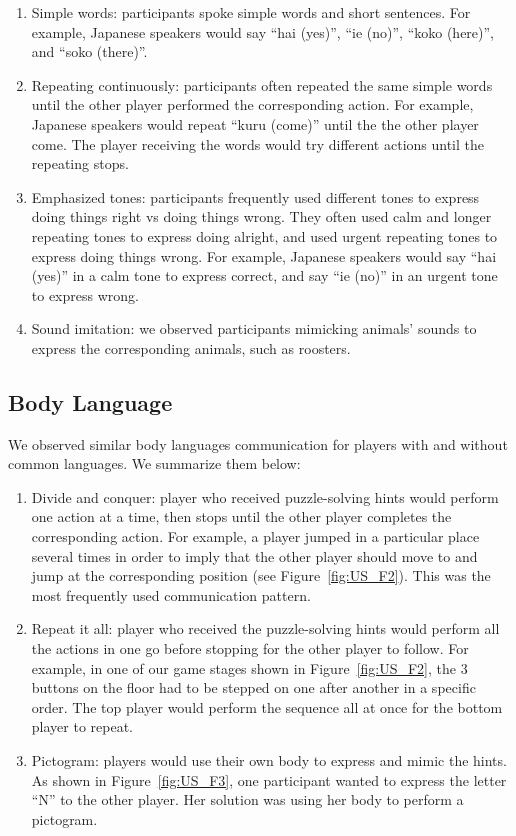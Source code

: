 \begin{enumerate}
   \item Simple words: participants spoke simple words and short sentences. For example, Japanese speakers would say ``hai (yes)'', ``ie (no)'', ``koko (here)'', and ``soko (there)''.
   
     \item Repeating continuously: participants often repeated the same simple words until the other player performed the corresponding action. For example, Japanese speakers would repeat ``kuru (come)'' until the the other player come. The player receiving the words would try different actions until the repeating stops. 
  
     \item Emphasized tones: participants frequently used different tones to express doing things right vs doing things wrong. They often used calm and longer repeating tones to express doing alright, and used urgent repeating tones to express doing things wrong. For example, Japanese speakers would say ``hai (yes)'' in a calm tone to express correct, and say ``ie (no)'' in an urgent tone to express wrong.

  
  \item Sound imitation: we observed participants mimicking animals' sounds to express the corresponding animals, such as roosters.
\end{enumerate}

\subsection{Body Language}
We observed similar body languages communication for players with and without common languages. We summarize them below:

\begin{enumerate}
  \item Divide and conquer: player who received puzzle-solving hints would perform one action at a time, then stops until the other player completes the corresponding action. For example, a player jumped in a particular place several times in order to imply that the other player should move to and jump at the corresponding position (see Figure~\ref{fig:US_F2}). This was the most frequently used communication pattern.

  \item Repeat it all: player who received the puzzle-solving hints would perform all the actions in one go before stopping for the other player to follow. For example, in one of our game stages shown in Figure~\ref{fig:US_F2}, the 3 buttons on the floor had to be stepped on one after another in a specific order. The top player would perform the sequence all at once for the bottom player to repeat. 
                                   
  \item Pictogram: players would use their own body to express and mimic the hints. As shown in Figure~\ref{fig:US_F3}, one participant wanted to express the letter ``N'' to the other player. Her solution was using her body to perform a pictogram.
\end{enumerate}

